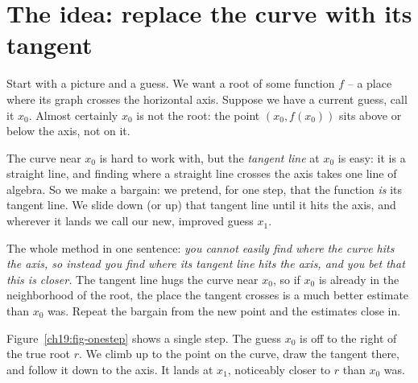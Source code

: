 \chapterline

\section{The idea: replace the curve with its tangent}
\label{ch19:the-idea}

Start with a picture and a guess. We want a root of some function $f$ -- a
place where its graph crosses the horizontal axis. Suppose we have a current guess,
call it $x_0$. Almost certainly $x_0$ is not the root: the point $(x_0, f(x_0))$
sits above or below the axis, not on it.

The curve near $x_0$ is hard to work with, but the \emph{tangent line} at $x_0$
is easy: it is a straight line, and finding where a straight line crosses the axis
takes one line of algebra. So we make a bargain: we pretend, for one step, that
the function \emph{is} its tangent line. We slide
down (or up) that tangent line until it hits the axis, and wherever it lands we
call our new, improved guess $x_1$.

\begin{intuitionbox}
The whole method in one sentence: \emph{you cannot easily find where the curve hits
the axis, so instead you find where its tangent line hits the axis, and you bet
that this is closer.} The tangent line hugs the curve near $x_0$, so if $x_0$ is
already in the neighborhood of the root, the place the tangent crosses is a much
better estimate than $x_0$ was. Repeat the bargain from the new point and the
estimates close in.
\end{intuitionbox}

Figure~\ref{ch19:fig-onestep} shows a single step. The guess $x_0$ is off to the
right of the true root $r$. We climb up to the point on the curve, draw the tangent
there, and follow it down to the axis. It lands at $x_1$, noticeably closer to $r$
than $x_0$ was.

